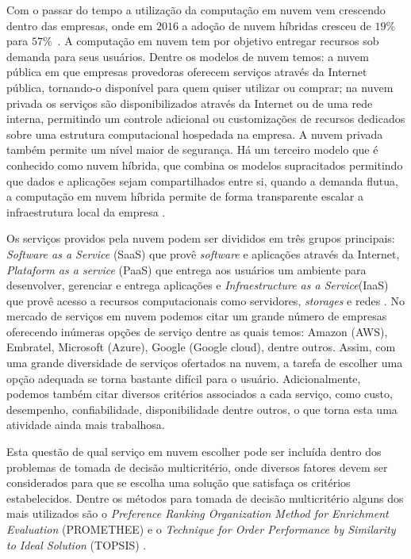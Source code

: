 \documentclass[openany, a4paper,12pt, oneside]{article}
\begin{document}
Com o passar do tempo a utilização da computação em nuvem vem crescendo dentro
das empresas, onde em $2016$ a adoção de nuvem híbridas cresceu de $19\%$ para $57\%$~\cite{Forbes}.
A computação em nuvem tem por objetivo entregar recursos sob demanda para seus
usuários. Dentre os modelos de nuvem temos: a nuvem pública em que empresas provedoras
oferecem serviços através da Internet pública, tornando-o disponível para quem quiser
utilizar ou comprar; na nuvem privada os serviços são disponibilizados através da
Internet ou de uma rede interna, permitindo um controle adicional ou customizações de recursos dedicados sobre uma estrutura computacional hospedada na
empresa. A nuvem privada também permite um nível maior de segurança. Há um terceiro
modelo que é conhecido como nuvem híbrida, que combina os modelos supracitados permitindo
que dados e aplicações sejam compartilhados entre si, quando a demanda flutua, a computação
em nuvem híbrida permite de forma transparente escalar a infraestrutura local da empresa \cite{Ms}.


Os serviços providos pela nuvem podem ser divididos em três grupos principais:
\textit{Software as a Service} (SaaS) que provê \textit{software} e aplicações através da Internet,
\textit{Plataform as a service} (PaaS) que entrega aos usuários um ambiente para desenvolver, gerenciar e
entrega aplicações e \textit{Infraestructure as a Service}(IaaS) que provê acesso a recursos
computacionais como servidores, \textit{storages} e redes \cite{IBM}.
No mercado de serviços em nuvem podemos citar um grande número de empresas
oferecendo inúmeras opções de serviço dentre as quais temos: Amazon (AWS), Embratel,
Microsoft (Azure), Google (Google cloud), dentre outros. Assim, com uma grande diversidade de serviços
ofertados na nuvem, a tarefa de escolher uma opção adequada se torna bastante difícil para o usuário.
Adicionalmente, podemos também citar diversos critérios associados a cada serviço, como custo,
desempenho, confiabilidade, disponibilidade dentre outros, o que torna esta uma atividade ainda mais trabalhosa.

Esta questão de qual serviço em nuvem escolher pode ser incluída dentro dos
problemas de tomada de decisão multicritério, onde diversos fatores devem ser
considerados para que se escolha uma solução que satisfaça os critérios estabelecidos. Dentre os métodos para tomada de
decisão multicritério alguns dos mais utilizados são o \textit{Preference Ranking Organization
Method for Enrichment Evaluation} (PROMETHEE) e o \textit{Technique for Order Performance by
Similarity to Ideal Solution} (TOPSIS) \cite{Javeed}.
\end{document}

